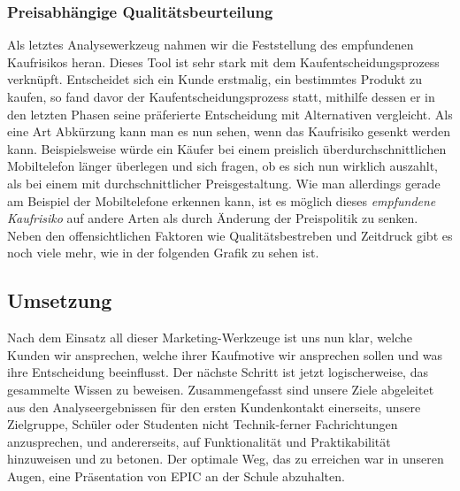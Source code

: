 \subsubsection{Preisabhängige Qualitätsbeurteilung}
Als letztes Analysewerkzeug nahmen wir die Feststellung des empfundenen Kaufrisikos heran. Dieses Tool ist sehr stark mit dem Kaufentscheidungsprozess verknüpft. Entscheidet sich ein Kunde erstmalig, ein bestimmtes Produkt zu kaufen, so fand davor der Kaufentscheidungsprozess statt, mithilfe dessen er in den letzten Phasen seine präferierte Entscheidung mit Alternativen vergleicht. Als eine Art Abkürzung kann man es nun sehen, wenn das Kaufrisiko gesenkt werden kann. Beispielsweise würde ein Käufer bei einem preislich überdurchschnittlichen Mobiltelefon länger überlegen und sich fragen, ob es sich nun wirklich auszahlt, als bei einem mit durchschnittlicher Preisgestaltung. Wie man allerdings gerade am Beispiel der Mobiltelefone erkennen kann, ist es möglich dieses \textit{empfundene Kaufrisiko} auf andere Arten als durch Änderung der Preispolitik zu senken. Neben den offensichtlichen Faktoren wie Qualitätsbestreben und Zeitdruck gibt es noch viele mehr, wie in der folgenden Grafik zu sehen ist.\\

\subsection{Umsetzung}
Nach dem Einsatz all dieser Marketing-Werkzeuge ist uns nun klar, welche Kunden wir ansprechen, welche ihrer Kaufmotive wir ansprechen sollen und was ihre Entscheidung beeinflusst. Der nächste Schritt ist jetzt logischerweise, das gesammelte Wissen zu beweisen. Zusammengefasst sind unsere Ziele abgeleitet aus den Analyseergebnissen für den ersten Kundenkontakt einerseits, unsere Zielgruppe, Schüler oder Studenten nicht Technik-ferner Fachrichtungen anzusprechen, und andererseits, auf Funktionalität und Praktikabilität hinzuweisen und zu betonen. Der optimale Weg, das zu erreichen war in unseren Augen, eine Präsentation von EPIC an der Schule abzuhalten.
